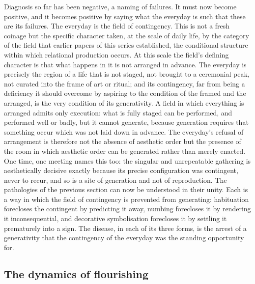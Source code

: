 Diagnosis so far has been negative, a naming of failures. It must now become positive, and it becomes positive by saying what the everyday is such that these are its failures. The everyday is the field of contingency. This is not a fresh coinage but the specific character taken, at the scale of daily life, by the category of the field that earlier papers of this series established, the conditional structure within which relational production occurs. At this scale the field's defining character is that what happens in it is not arranged in advance. The everyday is precisely the region of a life that is not staged, not brought to a ceremonial peak, not curated into the frame of art or ritual; and its contingency, far from being a deficiency it should overcome by aspiring to the condition of the framed and the arranged, is the very condition of its generativity. A field in which everything is arranged admits only execution: what is fully staged can be performed, and performed well or badly, but it cannot generate, because generation requires that something occur which was not laid down in advance. The everyday's refusal of arrangement is therefore not the absence of aesthetic order but the presence of the room in which aesthetic order can be generated rather than merely enacted. One time, one meeting names this too: the singular and unrepeatable gathering is aesthetically decisive exactly because its precise configuration was contingent, never to recur, and so is a site of generation and not of reproduction. The pathologies of the previous section can now be understood in their unity. Each is a way in which the field of contingency is prevented from generating: habituation forecloses the contingent by predicting it away, numbing forecloses it by rendering it inconsequential, and decorative symbolisation forecloses it by settling it prematurely into a sign. The disease, in each of its three forms, is the arrest of a generativity that the contingency of the everyday was the standing opportunity for.

\subsection{The dynamics of flourishing}
\label{p23:sub:diag-flourishing}

